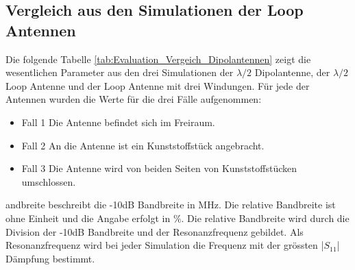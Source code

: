 



\newpage
\subsection{Vergleich aus den Simulationen der Loop Antennen}
Die folgende Tabelle \ref{tab:Evaluation_Vergeich_Dipolantennen} zeigt die wesentlichen Parameter aus den drei Simulationen der $\lambda/2$ Dipolantenne, der $\lambda/2$ Loop Antenne und der Loop Antenne mit drei Windungen. Für jede der Antennen wurden die Werte für die drei Fälle aufgenommen:\\
\begin{itemize}
\item Fall 1 Die Antenne befindet sich im Freiraum.
\item Fall 2 An die Antenne ist ein Kunststoffstück angebracht.
\item Fall 3 Die Antenne wird von beiden Seiten von Kunststoffstücken umschlossen.
\end{itemize}
andbreite beschreibt die -10dB Bandbreite in MHz. Die relative Bandbreite ist ohne Einheit und die Angabe erfolgt in $\%$. Die relative Bandbreite wird durch die Division der -10dB Bandbreite und der Resonanzfrequenz gebildet. Als Resonanzfrequenz wird bei jeder Simulation die Frequenz mit der grössten |$S_{11}$| Dämpfung bestimmt.\\

